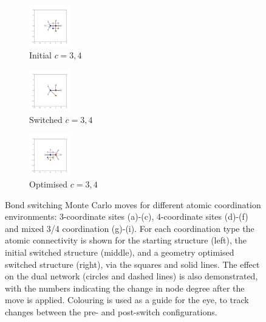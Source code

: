 \begin{figure}[bt]
     \vspace{2mm}
     \begin{subfigure}[b]{0.25\textwidth}
         \centering
         \includegraphics[height=1.8cm]{./figures/general_networks/bs_move_g.pdf}
         \caption{Initial $c=3,4$}
         \label{fig:bsmoveg}
     \end{subfigure}
     \hfill
     \begin{subfigure}[b]{0.25\textwidth}
         \centering
         \includegraphics[height=1.8cm]{./figures/general_networks/bs_move_h.pdf}
         \caption{Switched $c=3,4$}
         \label{fig:bsmoveh}
     \end{subfigure}
     \hfill
     \begin{subfigure}[b]{0.25\textwidth}
         \centering
         \includegraphics[height=1.8cm]{./figures/general_networks/bs_move_i.pdf}
         \caption{Optimised $c=3,4$}
         \label{fig:bsmovei}
     \end{subfigure}
     
     \caption{Bond switching Monte Carlo moves for different atomic coordination environments: 3\--coordinate sites (a)-(c), 4\--coordinate sites (d)-(f) and mixed 3/4 coordination (g)-(i). For each coordination type the atomic connectivity is shown for the starting structure (left), the initial switched structure (middle), and a geometry optimised switched structure (right), via the squares and solid lines. The effect on the dual network (circles and dashed lines) is also demonstrated, with the numbers indicating the change in node degree after the move is applied. Colouring is used as a guide for the eye, to track changes between the pre\-- and post\--switch configurations.
}
     \label{fig:bsmoves}
\end{figure}

